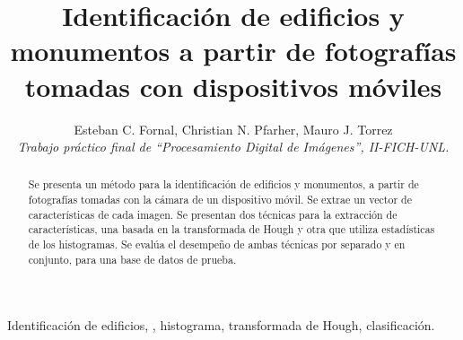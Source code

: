 \documentclass[conference,a4paper,10pt,oneside,final]{tfmpd}
\begin{document}
\title{Identificación de edificios y monumentos a partir de fotografías
tomadas con dispositivos móviles}
\author{Esteban C. Fornal, Christian N. Pfarher, Mauro J. Torrez\\
\textit{Trabajo práctico final de ``Procesamiento Digital de
Imágenes'', II-FICH-UNL.}}
\maketitle
%
%
%
%
\begin{abstract}
Se presenta un método para la identificación de edificios y monumentos, a
partir de fotografías tomadas con la cámara de un dispositivo móvil.
Se extrae un vector de características  de cada imagen.
Se presentan dos técnicas para la extracción de
características, una basada en la transformada de Hough y otra que
utiliza estadísticas de los histogramas.
Se evalúa el desempeño 
de ambas técnicas por separado y en
conjunto, para una base de datos de prueba.
\end{abstract}
%
%
%
%
\begin{keywords}
Identificación de edificios, ,
histograma, transformada de Hough, clasificación.
\end{keywords}
%
%
%
%
\end{document}
